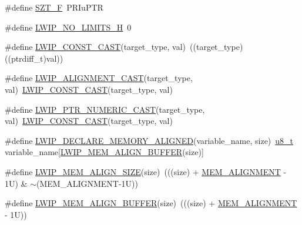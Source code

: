 \begin{DoxyCompactItemize}
\item 
\#define \hyperlink{group__compiler__abstraction_ga4cd359b6110f318ef71814587e1df029}{S\+Z\+T\+\_\+F}~P\+R\+Iu\+P\+TR
\item 
\#define \hyperlink{group__compiler__abstraction_gade9c8513419a799cd78a07ae894bb805}{L\+W\+I\+P\+\_\+\+N\+O\+\_\+\+L\+I\+M\+I\+T\+S\+\_\+H}~0
\item 
\#define \hyperlink{group__compiler__abstraction_gaa0dd3f76dd9a837feaac61fedc0dbe72}{L\+W\+I\+P\+\_\+\+C\+O\+N\+S\+T\+\_\+\+C\+A\+ST}(target\+\_\+type,  val)~((target\+\_\+type)((ptrdiff\+\_\+t)val))
\item 
\#define \hyperlink{group__compiler__abstraction_gaade87973d72135b0b3afccfff4f62eb8}{L\+W\+I\+P\+\_\+\+A\+L\+I\+G\+N\+M\+E\+N\+T\+\_\+\+C\+A\+ST}(target\+\_\+type,  val)~\hyperlink{group__compiler__abstraction_gaa0dd3f76dd9a837feaac61fedc0dbe72}{L\+W\+I\+P\+\_\+\+C\+O\+N\+S\+T\+\_\+\+C\+A\+ST}(target\+\_\+type, val)
\item 
\#define \hyperlink{group__compiler__abstraction_ga683e5c35d3263fe3145e6a6bc546604a}{L\+W\+I\+P\+\_\+\+P\+T\+R\+\_\+\+N\+U\+M\+E\+R\+I\+C\+\_\+\+C\+A\+ST}(target\+\_\+type,  val)~\hyperlink{group__compiler__abstraction_gaa0dd3f76dd9a837feaac61fedc0dbe72}{L\+W\+I\+P\+\_\+\+C\+O\+N\+S\+T\+\_\+\+C\+A\+ST}(target\+\_\+type, val)
\item 
\#define \hyperlink{group__compiler__abstraction_ga651bb349041669fe717b19f127ef16c0}{L\+W\+I\+P\+\_\+\+D\+E\+C\+L\+A\+R\+E\+\_\+\+M\+E\+M\+O\+R\+Y\+\_\+\+A\+L\+I\+G\+N\+ED}(variable\+\_\+name,  size)~\hyperlink{group__compiler__abstraction_ga4caecabca98b43919dd11be1c0d4cd8e}{u8\+\_\+t} variable\+\_\+name\mbox{[}\hyperlink{group__compiler__abstraction_ga25591dcb72fccc7b5dc46fbc1959694e}{L\+W\+I\+P\+\_\+\+M\+E\+M\+\_\+\+A\+L\+I\+G\+N\+\_\+\+B\+U\+F\+F\+ER}(size)\mbox{]}
\item 
\#define \hyperlink{group__compiler__abstraction_gaef204be511fd32f681b55abc08e9ae18}{L\+W\+I\+P\+\_\+\+M\+E\+M\+\_\+\+A\+L\+I\+G\+N\+\_\+\+S\+I\+ZE}(size)~(((size) + \hyperlink{group__lwip__opts__mem_ga97343214666ee6dcb18c0bd77b441ea7}{M\+E\+M\+\_\+\+A\+L\+I\+G\+N\+M\+E\+NT} -\/ 1\+U) \& $\sim$(\+M\+E\+M\+\_\+\+A\+L\+I\+G\+N\+M\+E\+N\+T-\/1\+U))
\item 
\#define \hyperlink{group__compiler__abstraction_ga25591dcb72fccc7b5dc46fbc1959694e}{L\+W\+I\+P\+\_\+\+M\+E\+M\+\_\+\+A\+L\+I\+G\+N\+\_\+\+B\+U\+F\+F\+ER}(size)~(((size) + \hyperlink{group__lwip__opts__mem_ga97343214666ee6dcb18c0bd77b441ea7}{M\+E\+M\+\_\+\+A\+L\+I\+G\+N\+M\+E\+NT} -\/ 1\+U))
\item 

\end{DoxyCompactItemize}
